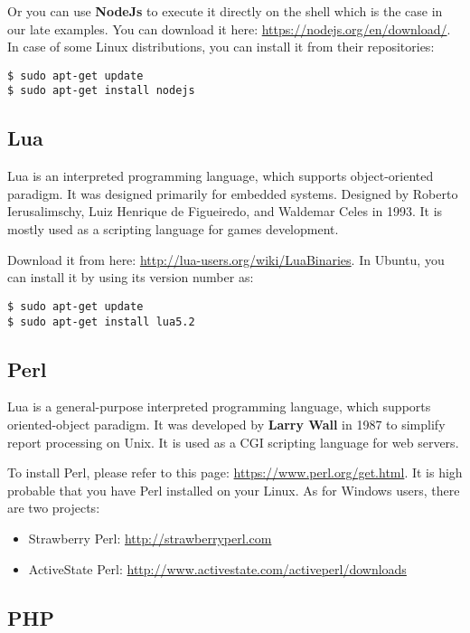 \documentclass{KBook}
\begin{document}
Or you can use \textbf{NodeJs} to execute it directly on the shell which is the case in our late examples. 
You can download it here: \url{https://nodejs.org/en/download/}. 
In case of some Linux distributions, you can install it from their repositories:
\begin{lstlisting}[style=shellStyle]
$ sudo apt-get update
$ sudo apt-get install nodejs
\end{lstlisting}

\subsection{Lua}

Lua is an interpreted programming language, which supports object-oriented paradigm. 
It was designed primarily for embedded systems.
Designed by Roberto Ierusalimschy, Luiz Henrique de Figueiredo, and Waldemar Celes in 1993.
It is mostly used as a scripting language for games development.

Download it from here: \url{http://lua-users.org/wiki/LuaBinaries}. 
In Ubuntu, you can install it by using its version number as:
\begin{lstlisting}[style=shellStyle]
$ sudo apt-get update
$ sudo apt-get install lua5.2
\end{lstlisting}


\subsection{Perl}

Lua is a general-purpose interpreted programming language, which supports oriented-object paradigm. 
It was developed by \textbf{Larry Wall} in 1987 to simplify report processing on Unix.
It is used as a CGI scripting language for web servers.

To install Perl, please refer to this page: \url{https://www.perl.org/get.html}. 
It is high probable that you have Perl installed on your Linux. 
As for Windows users, there are two projects: 
\begin{itemize}
	\item Strawberry Perl: \url{http://strawberryperl.com}
	\item ActiveState Perl: \url{http://www.activestate.com/activeperl/downloads}
\end{itemize}

\subsection{PHP}
\end{document}
